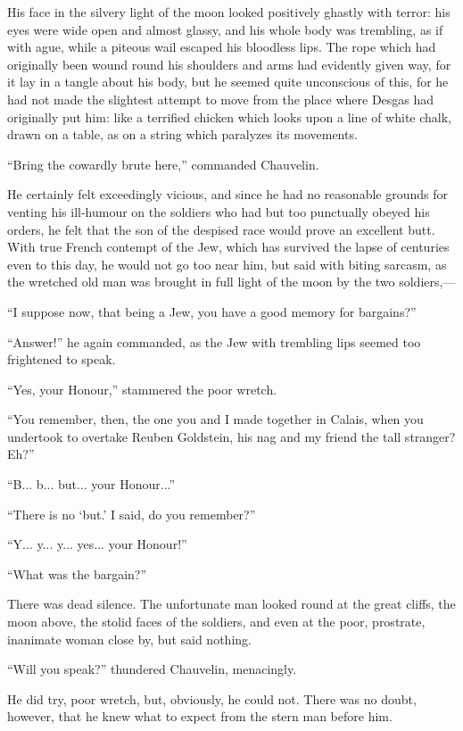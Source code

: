 His face in the silvery light of the moon looked positively ghastly with terror: his eyes were wide open and almost glassy, and his whole body was trembling, as if with ague, while a piteous wail escaped his bloodless lips. The rope which had originally been wound round his shoulders and arms had evidently given way, for it lay in a tangle about his body, but he seemed quite unconscious of this, for he had not made the slightest attempt to move from the place where Desgas had originally put him: like a terrified chicken which looks upon a line of white chalk, drawn on a table, as on a string which paralyzes its movements.

\enquote{Bring the cowardly brute here,} commanded Chauvelin.

He certainly felt exceedingly vicious, and since he had no reasonable grounds for venting his ill-humour on the soldiers who had but too punctually obeyed his orders, he felt that the son of the despised race would prove an excellent butt. With true French contempt of the Jew, which has survived the lapse of centuries even to this day, he would not go too near him, but said with biting sarcasm, as the wretched old man was brought in full light of the moon by the two soldiers,---

\enquote{I suppose now, that being a Jew, you have a good memory for bargains?}

\enquote{Answer!} he again commanded, as the Jew with trembling lips seemed too frightened to speak.

\enquote{Yes, your Honour,} stammered the poor wretch.

\enquote{You remember, then, the one you and I made together in Calais, when you undertook to overtake Reuben Goldstein, his nag and my friend the tall stranger? Eh?}

\enquote{B... b... but... your Honour...}

\enquote{There is no \enquote{but.} I said, do you remember?}

\enquote{Y... y... y... yes... your Honour!}

\enquote{What was the bargain?}

There was dead silence. The unfortunate man looked round at the great cliffs, the moon above, the stolid faces of the soldiers, and even at the poor, prostrate, inanimate woman close by, but said nothing.

\enquote{Will you speak?} thundered Chauvelin, menacingly.

He did try, poor wretch, but, obviously, he could not. There was no doubt, however, that he knew what to expect from the stern man before him.

